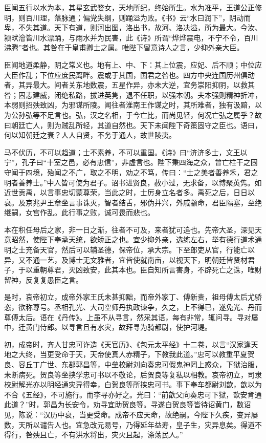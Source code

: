 \documentclass[]{article}
\begin{document}
臣闻五行以水为本，其星玄武婺女，天地所纪，终始所生。水为准平，王道公正修明，则百川理，落脉通；偏党失纲，则踊溢为败。《书》云``水曰润下''，阴动而卑，不失其道。天下有道，则河出图，洛出书，故河、洛决溢，所为最大。今汝、颍畎澮皆川水漂踊，与雨水并为民害，此《诗》所谓``烨烨震电，不宁不令，百川沸腾''者也。其咎在于皇甫卿士之属。唯陛下留意诗人之言，少抑外亲大臣。

臣闻地道柔静，阴之常义也。地有上、中、下：其上位震，应妃、后不顺；中位应大臣作乱；下位应庶民离畔。震或于其国，国君之咎也。四方中央连国历州俱动者，其异最大。间者关东地数震，五星作异，亦未大逆，宜务崇阳抑阴，以救其咎；固志建威，闭绝私路，拔进英隽，退不任职，以强本朝。夫本强则精神折冲，本弱则招殃致凶，为邪谋所陵。闻往者淮南王作谋之时，其所难者，独有汲黯，以为公孙弘等不足言也。弘，汉之名相，于今亡比，而尚见轻，何况亡弘之属乎？故曰朝廷亡人，则为贼乱所轻，其道自然也。天下未闻陛下奇策固守之臣也。语曰，何以知朝廷之衰？人人自贤，不务于通人，故世陵夷。

马不伏历，不可以趋道；士不素养，不可以重国。《诗》曰``济济多士，文王以宁''，孔子曰``十室之邑，必有忠信''，非虚言也。陛下秉四海之众，曾亡柱干之固守闻于四境，殆闻之不广，取之不明，劝之不笃，传曰：``士之美者善养禾，君之明者善养士。''中人皆可使为君子。诏书进贤良，赦小过，无求备，以博聚英隽。如近世贡禹，以言事忠切蒙尊荣，当此之时，士厉身立名者多。禹死之后，日日以衰。及京兆尹王章坐言事诛灭，智者结舌，邪伪并兴，外戚颛命，君臣隔塞，至绝继嗣，女宫作乱。此行事之败，诚可畏而悲也。

本在积任母后之家，非一日之渐，往者不可及，来者犹可追也。先帝大圣，深见天意昭然，使陛下奉承天统，欲矫正之也。宜少抑外亲，选练左右，举有德行道术通明之士充备天官，然后可以辅圣德，保帝位，承大宗。下至郎吏从官，行能亡以异，又不通一艺，及博士无文雅者，宜皆使就南亩，以视天下，明朝廷皆贤材君子，于以重朝尊君，灭凶致安，此其本也。臣自知所言害身，不辟死亡之诛，唯财留神，反复复愚臣之言。

是时，哀帝初立，成帝外家王氏未甚抑黜，而帝外家丁、傅新贵，祖母傅太后尤骄恣，欲称尊号。丞相孔光、大司空师丹执政谏争，久之，上不得已，遂免光、丹而尊傅太后。语在《丹传》。上虽不从寻言，然采其语，每有非常，辄问寻。寻对屡中，迁黄门侍郎。以寻言且有水灾，故拜寻为骑都尉，使护河堤。

初，成帝时，齐人甘忠可诈造《天官历》、《包元太平经》十二卷，以言``汉家逢天地之大终，当更受命于天，天帝使真人赤精子，下教我此道。''忠可以教重平夏贺良、容丘丁广世、东郡郭昌等，中垒校尉刘向奏忠可假鬼神罔上惑众，下狱治服，未断病死。贺良等坐挟学忠可书以不敬论，后贺良等复私以相教。哀帝初立，司隶校尉解光亦以明经通灾异得幸，白贺良等所挟忠可书。事下奉车都尉刘歆，歆以为不合《五经》，不可施行。而李寻亦好之。光曰：``前歆父向奏忠可下狱，歆安肯通此道？''时，郭昌为长安令，劝寻宜助贺良等。寻遂白贺良等皆待诏黄门，数诏见，陈说：``汉历中衰，当更受命。成帝不应天命，故绝嗣。今陛下久疾，变异屡数，天所以谴告人也。宜急改元易号，乃得延年益寿，皇子生，灾异息矣。得道不得行，咎殃且亡，不有洪水将出，灾火且起，涤荡民人。''
\end{document}

